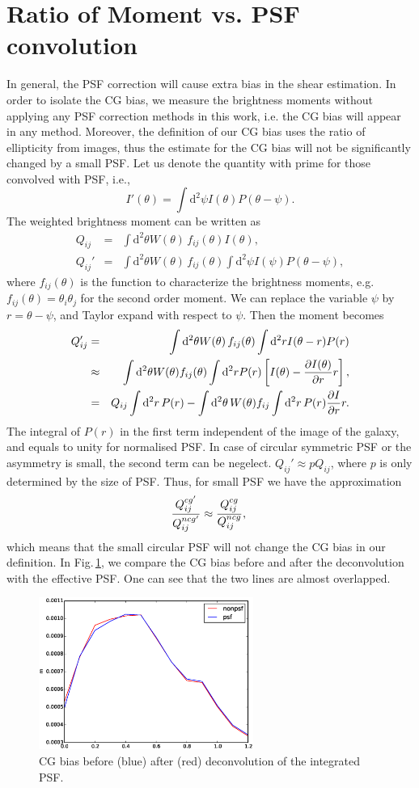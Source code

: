 \documentclass[useAMS,usenatbib]{mn2e}
\renewcommand{\d}{\mathrm{d}}
\newcommand{\bea}{\begin{eqnarray}}
\newcommand{\eea}{\end{eqnarray}}
\newcommand{\be}{\begin{equation}}
\newcommand{\ee}{\end{equation}}
\newcommand{\eck}[1]{\left[ #1 \right]}
\begin{document}
\appendix
\section{Ratio of Moment vs. PSF convolution}
In general, the PSF correction will cause extra bias in the shear estimation. In order to isolate the CG bias, we measure the brightness moments without applying any PSF correction methods in this work, i.e. the CG bias will appear in any method. Moreover, the definition of our CG bias uses the ratio of ellipticity from images, thus the estimate for the CG bias will not be significantly changed by a small PSF.  Let us denote the quantity with prime for those convolved with PSF, i.e.,
%
\be
I'(\theta) = \int \d^2 \psi I(\theta) P(\theta-\psi).
\ee
%
The weighted brightness moment can be written as
%
\bea
Q_{ij} &=& \int \d^2 \theta W(\theta)\, f_{ij}(\theta) I(\theta ),\\
Q_{ij}' &=& \int \d^2 \theta W(\theta)\, f_{ij}(\theta)\int \d^2\psi I(\psi) P(\theta-\psi),
\eea
%
where $f_{ij}(\theta)$ is the function to characterize the brightness moments, e.g. $f_{ij}(\theta)=\theta_i\theta_j$ for the second order moment. We can replace the variable $\psi$ by $r=\theta-\psi$, and Taylor expand with respect to $\psi$. Then the moment becomes
%
\bea
Q_{ij}' &=& \int \d^2 \theta W(\theta)\, f_{ij}(\theta) \int \d^2r I(\theta-r) P(r)\\
&\approx &\int \d^2 \theta W(\theta) f_{ij}(\theta) \int \d^2r P(r) \eck{I(\theta)-{\partial I(\theta) \over \partial r}r}, \nonumber \\
&=&Q_{ij} \int \d^2r\,P(r) - \int \d^2\theta\, W(\theta) f_{ij} \int \d^2r\, P(r) {\partial I\over \partial r}r.\nonumber
\eea
%
The integral of $P(r)$ in the first term independent of the image of the galaxy, and equals to unity for normalised PSF. In case of circular symmetric PSF or the asymmetry is small, the second term can be negelect. $Q_{ij}'\approx p Q_{ij}$, where $p$ is only determined by the size of PSF. Thus, for small PSF we have the approximation
%
\be
{Q^{cg'}_{ij} \over Q^{ncg'}_{ij}} \approx 
{Q^{cg}_{ij} \over Q^{ncg}_{ij}}, \; 
\ee
%
which means that the small circular PSF will not change the CG bias in our definition. In Fig.\,\ref{fig:psftest}, we compare the CG bias before and after the deconvolution with the effective PSF. One can see that the two lines are almost overlapped.
%
\begin{figure}
\includegraphics[width=7.0cm]{zpsft1.eps}
\caption{
  CG bias before (blue) after (red) deconvolution of the integrated PSF.
}
\label{fig:psftest}
\end{figure}
%





\end{document}
